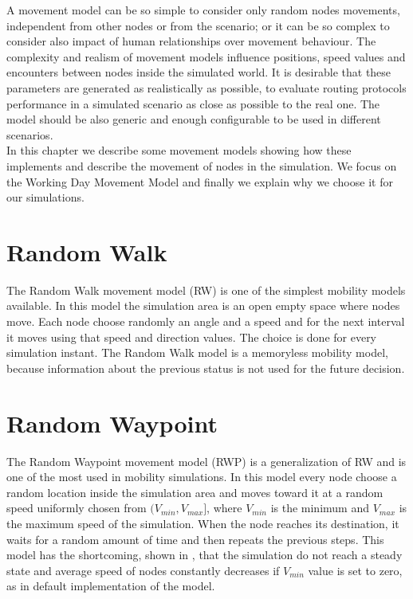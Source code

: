 A movement model can be so simple to consider only random nodes movements, independent from other nodes or from the scenario; or it can be so complex to consider also impact of human relationships over movement behaviour. The complexity and realism of movement models influence positions, speed values and encounters between nodes inside the simulated world. It is desirable that these parameters are generated as realistically as possible, to evaluate routing protocols performance in a simulated scenario as close as possible to the real one. The model should be also generic and enough configurable to be used in different scenarios.
\\

In this chapter we describe some movement models showing how these implements and describe the movement of nodes in the simulation. We focus on the Working Day Movement Model and finally we explain why we choose it for our simulations.


\section{Random Walk}
The Random Walk movement model (RW) is one of the simplest mobility models available. In this model the simulation area is an open empty space where nodes move. Each node choose randomly an angle and a speed and for the next interval it moves using that speed and direction values. The choice is done for every simulation instant. The Random Walk model is a memoryless mobility model, because information about the previous status is not used for the future decision. 


\section{Random Waypoint}
The Random Waypoint movement model (RWP) is a generalization of RW and is one of the most used in mobility simulations. In this model every node choose a random location inside the simulation area and moves toward it at a random speed uniformly chosen from $(V_{min}, V_{max}]$, where $V_{min}$ is the minimum and $V_{max}$ is the maximum speed of the simulation. When the node reaches its destination, it waits for a random amount of time and then repeats the previous steps. This model has the shortcoming, shown in \cite{rwpharmful}, that the simulation do not reach a steady state and average speed of nodes constantly decreases if $V_{min}$ value is set to zero, as in default implementation of the model. 


